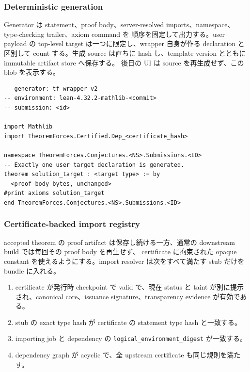 \documentclass[a4paper,11pt]{ltjsarticle}
\begin{document}
\subsubsection{Deterministic generation}

Generator は statement、proof body、server-resolved imports、namespace、type-checking trailer、axiom command を
順序を固定して出力する。user payload の top-level target は一つに限定し、wrapper 自身が作る declaration と区別して
count する。生成 source は直ちに hash し、template version とともに immutable artifact store へ保存する。
後日の UI は source を再生成せず、この blob を表示する。

\begin{lstlisting}[caption={生成 artifact の概念例}]
-- generator: tf-wrapper-v2
-- environment: lean-4.32.2-mathlib-<commit>
-- submission: <id>

import Mathlib
import TheoremForces.Certified.Dep_<certificate_hash>

namespace TheoremForces.Conjectures.<NS>.Submissions.<ID>
-- Exactly one user target declaration is generated.
theorem solution_target : <target type> := by
  <proof body bytes, unchanged>
#print axioms solution_target
end TheoremForces.Conjectures.<NS>.Submissions.<ID>
\end{lstlisting}

\subsubsection{Certificate-backed import registry}

accepted theorem の proof artifact は保存し続ける一方、通常の downstream build では毎回その proof body を再生せず、
certificate に拘束された opaque constant を使えるようにする。import resolver は次をすべて満たす stub だけを bundle に入れる。

\begin{enumerate}
  \item certificate が発行時 checkpoint で valid で、現在 status と taint が別に提示され、canonical core、issuance signature、transparency evidence が有効である。
  \item stub の exact type hash が certificate の statement type hash と一致する。
  \item importing job と dependency の \texttt{logical\_environment\_digest} が一致する。
  \item dependency graph が acyclic で、全 upstream certificate も同じ規則を満たす。
\end{enumerate}
\end{document}
